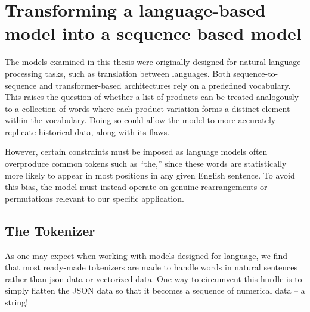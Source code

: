\documentclass[12pt,a4paper]{report}
\begin{document}
\section{Transforming a language-based model into a sequence based model}

The models examined in this thesis were originally designed for natural language processing tasks, such as translation between languages. Both sequence-to-sequence and transformer-based architectures rely on a predefined vocabulary. This raises the question of whether a list of products can be treated analogously to a collection of words where each product variation forms a distinct element within the vocabulary. Doing so could allow the model to more accurately replicate historical data, along with its flaws.

However, certain constraints must be imposed as language models often overproduce common tokens such as “the,” since these words are statistically more likely to appear in most positions in any given English sentence. To avoid this bias, the model must instead operate on genuine rearrangements or permutations relevant to our specific application.

\subsection{The Tokenizer}
    As one may expect when working with models designed for language, we find that most ready-made tokenizers are made to handle words in natural sentences rather than json-data or vectorized data. One way to circumvent this hurdle is to simply flatten the JSON data so that it becomes a sequence of numerical data -- a string!
\end{document}
